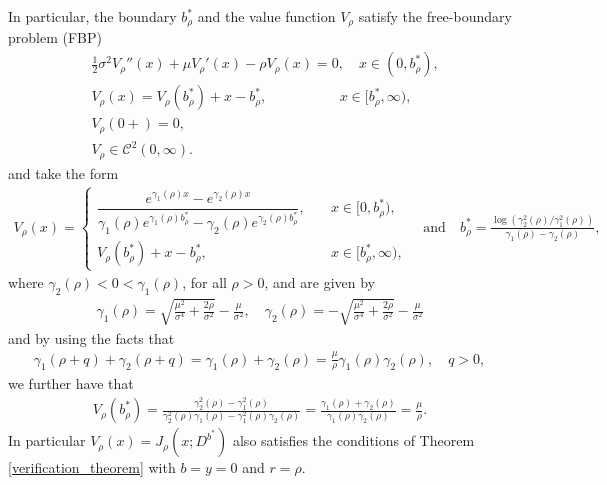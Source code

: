 \documentclass[11pt]{article} %
\numberwithin{komcounter}{section}
\numberwithin{equation}{section}
\numberwithin{theorem}{section}
\begin{document}
In particular, the boundary $b_\rho^*$ and the value function $V_\rho$ 
satisfy the free-boundary problem (FBP)
\begin{align}
&\tfrac12 \sigma^2 V_\rho''(x)+\mu V_\rho'(x) - \rho V_\rho(x) = 0 , \quad x\in (0,b_\rho^*), \label{FBP_single_tresholda}\\
&V_\rho(x) = V_\rho(b_\rho^*) + x- b_\rho^*, \qquad \qquad \quad \, x \in [b_\rho^*,\infty), \label{FBP_single_tresholdb}\\ 
&V_\rho(0+) = 0,  \label{FBP_single_tresholdc}\\ 
&V_\rho \in {\mathcal{C}^2(0,\infty)}
\label{FBP_single_tresholdc}.
\end{align}
and take the form 
\begin{align} \label{value_classical}
V_\rho(x) = \begin{cases}
\dfrac{e^{\gamma_1(\rho) x} - e^{\gamma_2(\rho)x}}{\gamma_1(\rho) e^{\gamma_1(\rho) b^*_\rho} - \gamma_2(\rho) e^{\gamma_2(\rho)b^*_\rho}}, 
\quad &x\in[0,b^*_\rho),\\
V_\rho(b^*_\rho) + x - b^*_\rho, 
\quad &x\in [b^*_\rho,\infty),
\end{cases}
\quad \text{and} \quad 
b_\rho^* = \frac{\log\left(\gamma_2^2(\rho) / \gamma_1^2(\rho)\right)}{\gamma_1(\rho)-\gamma_2(\rho)} ,
\end{align}
where $\gamma_2(\rho) < 0 < \gamma_1(\rho)$, for all $\rho>0$, and are given by 
\begin{align} \label{gamma_def}
\gamma_1(\rho)= \sqrt{\frac{\mu^2}{\sigma^4}+\frac{2\rho}{\sigma^2}}-\frac{\mu}{\sigma^2},\quad \gamma_2(\rho)= -\sqrt{\frac{\mu^2}{\sigma^4}+\frac{2\rho}{\sigma^2}}-\frac{\mu}{\sigma^2}
\end{align}
and by using the facts that 
\begin{align} \label{lemma_useful_results_gamma} 
\gamma_1(\rho+q) + \gamma_2(\rho + q)
= \gamma_1(\rho) + \gamma_2(\rho)
= \tfrac{\mu}{\rho}  \gamma_1(\rho) \gamma_2(\rho), 
\quad q > 0,
\end{align}
we further have that 
\begin{align} \label{lemma_useful_results_Vb}
V_{\rho}(b^*_{\rho})
=\frac{\gamma_2^2(\rho)-\gamma_1^2(\rho)}{\gamma_2^2(\rho)\gamma_1(\rho)-\gamma_1^2(\rho)\gamma_2(\rho)}
= \frac{\gamma_1(\rho) + \gamma_2(\rho)}{\gamma_1(\rho) \gamma_2(\rho)} = \frac{\mu}{\rho}.
\end{align}
In particular $V_\rho(x)=J_\rho(x;D^{b^*})$ also satisfies the conditions of Theorem \ref{verification_theorem} with $b=y=0$ and $r=\rho$.
\end{document}
